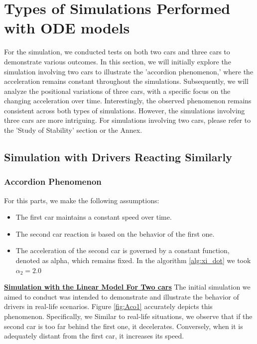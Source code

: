 \documentclass{article}
\begin{document}
		
	
	
	
	
	\section{Types of Simulations Performed with ODE models}
	
	For the simulation, we conducted tests on both two cars and three cars to demonstrate various outcomes. In this section, we will initially explore the simulation involving two cars to illustrate the 'accordion phenomenon,' where the acceleration remains constant throughout the simulations. Subsequently, we will analyze the positional variations of three cars, with a specific focus on the changing acceleration over time. Interestingly, the observed phenomenon remains consistent across both types of simulations. However, the simulations involving three cars are more intriguing. For simulations involving two cars, please refer to the 'Study of Stability' section or the Annex.
	
	\subsection{Simulation with Drivers Reacting Similarly}
		\subsubsection{Accordion Phenomenon}
		
		For this parts, we make the following assumptions:
		
		\begin{itemize}
			\item The first car maintains a constant speed over time.
			\item The second car reaction is based on the behavior of the first one.
			\item The acceleration of the second car is governed by a constant function, denoted as alpha, which remains fixed. In the algorithm \ref{alg:xi_dot} we took $\alpha_2=2.0$
		\end{itemize} 
		
		\textbf{\underline{Simulation with the Linear Model For Two cars}} \newline\newline
		The initial simulation we aimed to conduct was intended to demonstrate and illustrate the behavior of drivers in real-life scenarios. Figure \ref{fig:Aco1} accurately depicts this phenomenon. Specifically, we Similar to real-life situations, we observe that if the second car is too far behind the first one, it decelerates. Conversely, when it is adequately distant from the first car, it increases its speed.
		
\end{document}
